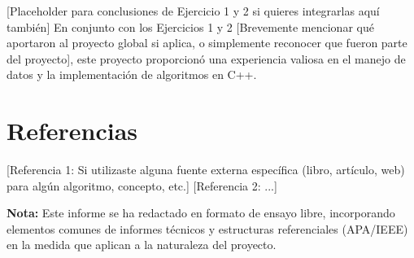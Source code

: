 \documentclass{article}
\begin{document}
[Placeholder para conclusiones de Ejercicio 1 y 2 si quieres integrarlas aquí también]
En conjunto con los Ejercicios 1 y 2 [Brevemente mencionar qué aportaron al proyecto global si aplica, o simplemente reconocer que fueron parte del proyecto], este proyecto proporcionó una experiencia valiosa en el manejo de datos y la implementación de algoritmos en C++.

\section*{Referencias} %

\begin{thebibliography}{99} %


     [Referencia 1: Si utilizaste alguna fuente externa específica (libro, artículo, web) para algún algoritmo, concepto, etc.]
     [Referencia 2: ...]

\end{thebibliography}

\vspace{1em} %
\noindent \textbf{Nota:} Este informe se ha redactado en formato de ensayo libre, incorporando elementos comunes de informes técnicos y estructuras referenciales (APA/IEEE) en la medida que aplican a la naturaleza del proyecto.

\end{document}

